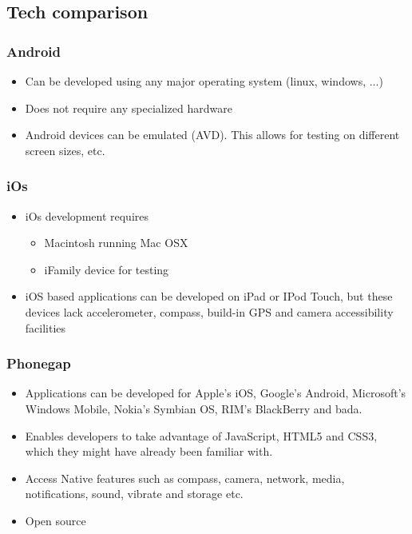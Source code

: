 \subsection{Tech comparison}

\subsubsection{Android}

\begin{itemize}
	\item Can be developed using any major operating system (linux, windows, ...)
	\item Does not require any specialized hardware
	\item Android devices can be emulated (AVD). This allows for testing on
	different screen sizes, etc.
\end{itemize}

\subsubsection{iOs}

\begin{itemize}
	\item iOs development requires
		\begin{itemize}
			\item Macintosh running Mac OSX
			\item iFamily device for testing
		\end{itemize}
	\item iOS based applications can be developed on iPad or IPod Touch, but
	these devices lack accelerometer, compass, build-in GPS and camera
	accessibility facilities
\end{itemize}

\subsubsection{Phonegap}

\begin{itemize}
	\item Applications can be developed for Apple’s iOS, Google’s Android,
	Microsoft’s Windows Mobile, Nokia’s Symbian OS, RIM’s BlackBerry and bada.
	\item Enables developers to take advantage of JavaScript, HTML5 and CSS3,
	which they might have already been familiar with.
	\item Access Native features such as compass, camera, network, media,
	notifications, sound, vibrate and storage etc.
	\item Open source
\end{itemize}
